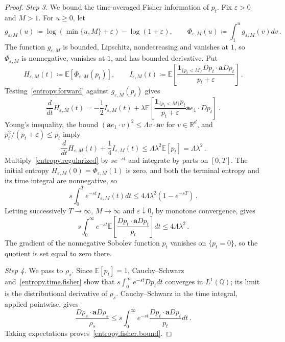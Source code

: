 \documentclass[11pt]{amsart}
\theoremstyle{definition}
\theoremstyle{remark}
\numberwithin{equation}{section}
\newcommand{\E}{\mathbb E}
\newcommand{\Q}{\mathbb Q}
\newcommand{\R}{\mathbb R}
\renewcommand{\a}{\mathbf a}
\begin{document}
\begin{proof}
\emph{Step 3.} We bound the time-averaged Fisher information of $p_t$. Fix $\varepsilon>0$ and $M>1$. For $u\geq0$, let
\begin{equation*}
 g_{\varepsilon,M}(u)
 \coloneqq\log(\min\{u,M\}+\varepsilon)-\log(1+\varepsilon),
 \qquad
 \Phi_{\varepsilon,M}(u)
 \coloneqq\int_1^u g_{\varepsilon,M}(v)dv\, .
\end{equation*}
The function $g_{\varepsilon,M}$ is bounded, Lipschitz, nondecreasing and vanishes at $1$, so $\Phi_{\varepsilon,M}$ is nonnegative, vanishes at $1$, and has bounded derivative. Put
\begin{equation*}
 H_{\varepsilon,M}(t)\coloneqq\E[\Phi_{\varepsilon,M}(p_t)],
 \qquad
 I_{\varepsilon,M}(t)\coloneqq
 \E\left[\frac{\mathbf1_{\{p_t<M\}}Dp_t\cdot\a Dp_t}
 {p_t+\varepsilon}\right]\, .
\end{equation*}
Testing~\eqref{entropy.forward} against $g_{\varepsilon,M}(p_t)$ gives
\begin{equation*}
 \frac{d}{dt}H_{\varepsilon,M}(t)
 =-\frac12 I_{\varepsilon,M}(t)
 +\lambda\E\left[
 \frac{\mathbf1_{\{p_t<M\}}p_t}{p_t+\varepsilon}
 \a e_1\cdot Dp_t\right]\, .
\end{equation*}
Young's inequality, the bound $(\a e_1\cdot v)^2\leq\Lambda v\cdot\a v$ for $v\in\R^d$, and $p_t^2/(p_t+\varepsilon)\leq p_t$ imply
\begin{equation}\label{entropy.regularized}
 \frac{d}{dt}H_{\varepsilon,M}(t)
 +\frac14I_{\varepsilon,M}(t)
 \leq\Lambda\lambda^2\E[p_t]=\Lambda\lambda^2\, .
\end{equation}
Multiply~\eqref{entropy.regularized} by $se^{-st}$ and integrate by parts on $[0,T]$. The initial entropy $H_{\varepsilon,M}(0)=\Phi_{\varepsilon,M}(1)$ is zero, and both the terminal entropy and its time integral are nonnegative, so
\begin{equation*}
 s\int_0^T e^{-st}I_{\varepsilon,M}(t)dt
 \leq4\Lambda\lambda^2(1-e^{-sT})\, .
\end{equation*}
Letting successively $T\to\infty$, $M\to\infty$ and $\varepsilon\downarrow0$, by monotone convergence, gives
\begin{equation}\label{entropy.time.fisher}
 s\int_0^\infty e^{-st}
 \E\left[\frac{Dp_t\cdot\a Dp_t}{p_t}\right]dt
 \leq4\Lambda\lambda^2\, .
\end{equation}
The gradient of the nonnegative Sobolev function $p_t$ vanishes on $\{p_t=0\}$, so the quotient is set equal to zero there.

\emph{Step 4.} We pass to $\rho_s$. Since $\E[p_t]=1$, Cauchy--Schwarz and~\eqref{entropy.time.fisher} show that $s\int_0^\infty e^{-st}Dp_tdt$ converges in $L^1(\Q)$; its limit is the distributional derivative of $\rho_s$. Cauchy--Schwarz in the time integral, applied pointwise, gives
\begin{equation*}
 \frac{D\rho_s\cdot\a D\rho_s}{\rho_s}
 \leq s\int_0^\infty e^{-st}
       \frac{Dp_t\cdot\a Dp_t}{p_t}dt\, .
\end{equation*}
Taking expectations proves~\eqref{entropy.fisher.bound}.
\end{proof}
\end{document}
